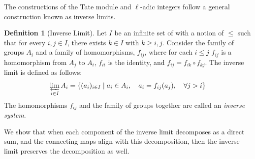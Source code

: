 \documentclass{article}
\theoremstyle{definition}
\newtheorem{definition}{Definition}[section]
\theoremstyle{definition}
\theoremstyle{definition}
\newcommand{\tate}{\operatorname{Tate_{\ell}}}
\begin{document}
The constructions of the Tate module and $\ell$-adic integers follow a general construction known as inverse limits.



\begin{definition}[Inverse Limit]
Let $I$ be an infinite set of with a notion of $\leq$ such that for every $i,j\in I$, there exists $k\in I$ with $k\geq i,j$. Consider the family of groups $A_i$ and a family of homomorphisms, $f_{ij}$, where for each $i\leq j$  $f_{ij}$ is a homomorphism from $A_j$ to $A_i$, $f_{ii}$ is the identity, and $f_{ij}=f_{ik}\circ f_{kj}$. The inverse limit is defined as follows:%
$$\varprojlim_{i \in I} A_i = \left\{ (a_i)_{i\in I} \;\middle|\; a_i\in A_i,\quad a_i = f_{ij}(a_j),\quad\forall j>i \right\}$$
The homomorphisms $f_{ij}$ and the family of groups together are called an \emph{inverse system}.
\end{definition}

We show that when each component of the inverse limit decomposes as a direct sum, and the connecting maps align with this decomposition, then the inverse limit preserves the decomposition as well.


\end{document}
